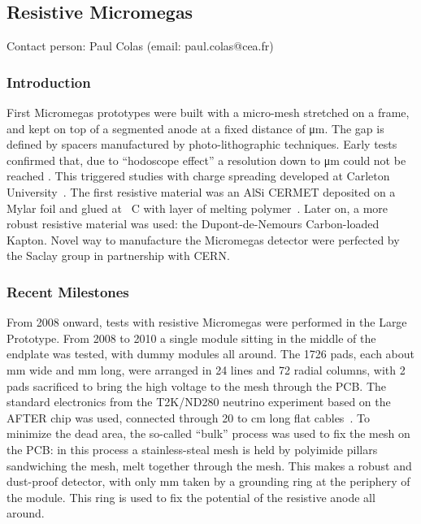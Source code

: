 \subsection{Resistive Micromegas}\label{chap:TPC_sec:micromegas}
Contact person: Paul Colas (email: paul.colas@cea.fr)\\

\subsubsection{Introduction}
First Micromegas prototypes were built with a micro-mesh stretched on a frame, and kept on top of
a segmented anode at a fixed distance of \unit[50]{\micro m}. The gap is defined by spacers manufactured
by photo-lithographic techniques. Early tests confirmed that, due to ``hodoscope effect'' a resolution
down to \unit[100]{\micro m} could not be reached \cite{Arogancia:2007pt}. This triggered studies with charge spreading
developed at Carleton University~\cite{Dixit:2003qg}.
The first resistive material was an AlSi CERMET deposited on a Mylar foil and glued at
\unit[90]{\textdegree C} with layer of melting polymer~\cite{2007NIMPA.581..254D}. Later on, a more robust resistive material was
used: the Dupont-de-Nemours Carbon-loaded Kapton. Novel way to manufacture the Micromegas detector
were perfected by the Saclay group in partnership with CERN.


\subsubsection{Recent Milestones}
From 2008 onward, tests with resistive Micromegas were performed in the Large Prototype. From 2008 to 2010
a single module sitting in the middle of the endplate was tested, with dummy modules all around. The 1726 pads, each about \unit[3]{mm} wide
and \unit[7]{mm} long,
were arranged in 24 lines and 72 radial columns, with 2 pads sacrificed to bring the high voltage to the mesh
through the PCB. The standard electronics from the T2K/ND280 neutrino experiment based on the AFTER chip
was used, connected through 20 to \unit[40]{cm} long flat cables~\cite{6418152}.
To minimize the dead area, the so-called ``bulk'' \cite{Giomataris:2004aa} process was used to fix the
mesh on the PCB: in this process a stainless-steal mesh is held by polyimide pillars sandwiching the mesh, melt together
through the mesh. This makes a robust and dust-proof detector, with only \unit[2]
{mm} taken by a grounding ring at the periphery of the module. This ring is used to fix the potential of the resistive anode all around.

